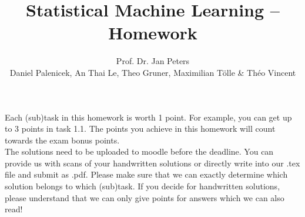 \documentclass[
	ngerman,
	points=true,%
    solution=true,
    accentcolor=9c,
    colorbacktitle
	]{tudaexercise}
\begin{document}
\title[Homework 1/4]{Statistical Machine Learning -- Homework}
\author{Prof. Dr. Jan Peters \\ Daniel Palenicek, An Thai Le, Theo Gruner, Maximilian Tölle \& Théo Vincent}

\maketitle
Each (sub)task in this homework is worth 1 point. For example, you can get up to 3 points in task 1.1. The points you achieve in this homework will count towards the exam bonus points. \\
The solutions need to be uploaded to moodle before the deadline. You can provide us with scans of your handwritten solutions or directly write into our .tex file and submit as .pdf. Please make sure that we can exactly determine which solution belongs to which (sub)task. If you decide for handwritten solutions, please understand that we can only give points for answers which we can also read! 
\end{document}
